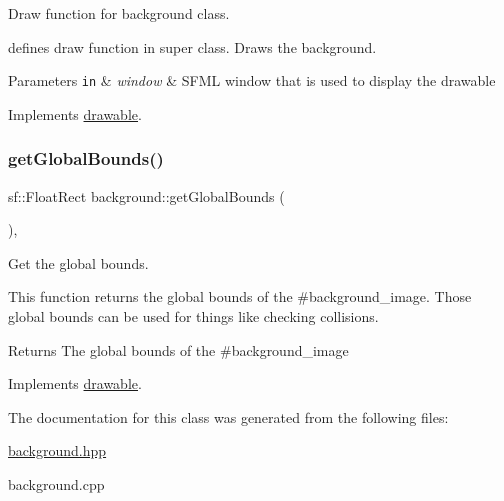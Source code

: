 Draw function for background class. 

defines draw function in super class. Draws the background.


\begin{DoxyParams}[1]{Parameters}
\mbox{\tt in}  & {\em window} & S\+F\+ML window that is used to display the drawable \\
\hline
\end{DoxyParams}


Implements \hyperlink{classdrawable_a4e49e2c1121704c83ce24c5f48dd910f}{drawable}.

\mbox{\label{classbackground_ab5f2b627cd58e0d07678f0af01c6bd2d}} 
\subsubsection{\texorpdfstring{get\+Global\+Bounds()}{getGlobalBounds()}}
{\footnotesize\ttfamily sf\+::\+Float\+Rect background\+::get\+Global\+Bounds (\begin{DoxyParamCaption}{ }\end{DoxyParamCaption})\hspace{0.3cm}{\ttfamily [override]}, {\ttfamily [virtual]}}



Get the global bounds. 

This function returns the global bounds of the \#background\+\_\+image. Those global bounds can be used for things like checking collisions. \begin{DoxyReturn}{Returns}
The global bounds of the \#background\+\_\+image 
\end{DoxyReturn}


Implements \hyperlink{classdrawable_ae013ac0be47538be9ce885d6642daf73}{drawable}.



The documentation for this class was generated from the following files\+:\begin{DoxyCompactItemize}
\item 
\hyperlink{background_8hpp}{background.\+hpp}\item 
background.\+cpp\end{DoxyCompactItemize}
